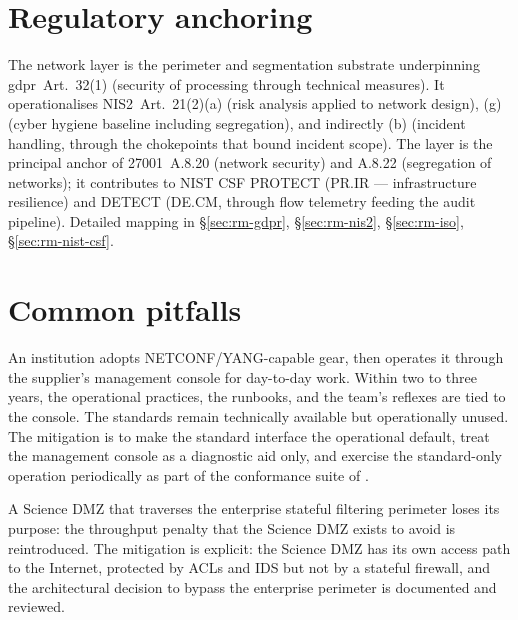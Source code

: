 \section{Regulatory anchoring}
\label{sec:nw-regulatory}

\noindent The network layer is the perimeter and segmentation
substrate underpinning \gls{gdpr}~Art.~32(1) (security of
processing through technical measures). It operationalises
NIS2~Art.~21(2)(a) (risk analysis applied to network design),
(g) (cyber hygiene baseline including segregation), and indirectly
(b) (incident handling, through the chokepoints that bound
incident scope). The layer is the principal anchor of
27001~A.8.20 (network security) and A.8.22 (segregation of
networks); it contributes to NIST CSF \textsf{PROTECT} (PR.IR ---
infrastructure resilience) and \textsf{DETECT} (DE.CM, through
flow telemetry feeding the audit pipeline). Detailed mapping in
 \S\ref{sec:rm-gdpr},
\S\ref{sec:rm-nis2}, \S\ref{sec:rm-iso}, \S\ref{sec:rm-nist-csf}.

\section{Common pitfalls}
\label{sec:nw-pitfalls}

\begin{pitfallbox}
\noindent An institution adopts NETCONF/YANG-capable gear, then
operates it through the supplier's management console for
day-to-day work. Within two to three years, the operational
practices, the runbooks, and the team's reflexes are tied to the
console. The standards remain technically available but
operationally unused. The mitigation is to make the standard
interface the operational default, treat the management console as a
diagnostic aid only, and exercise the standard-only operation
periodically as part of the conformance suite of
.
\end{pitfallbox}

\begin{pitfallbox}
\noindent A Science DMZ that traverses the enterprise stateful
filtering perimeter loses its purpose: the throughput penalty that
the Science DMZ exists to avoid is reintroduced. The mitigation is
explicit: the Science DMZ has its own access path to the Internet,
protected by ACLs and IDS but not by a stateful firewall, and the
architectural decision to bypass the enterprise perimeter is
documented and reviewed.
\end{pitfallbox}

